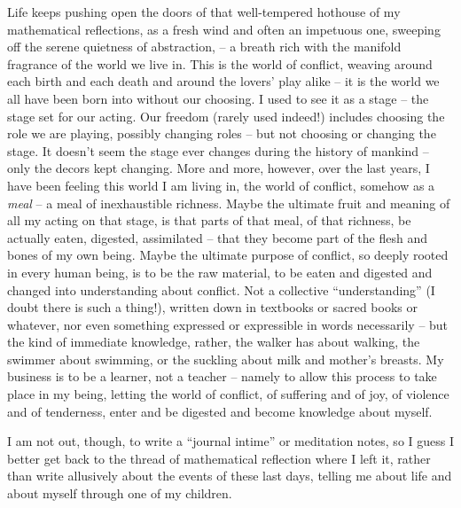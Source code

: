 \label{sec:140}%
Life keeps pushing open the doors of that well-tempered hothouse of my
mathematical reflections, as a fresh wind and often an impetuous one,
sweeping off the serene quietness of abstraction, -- a breath rich
with the manifold fragrance of the world we live in. This is the world
of conflict, weaving around each birth and each death and around the
lovers' play alike -- it is the world we all have been born into
without our choosing. I used to see it as a stage -- the stage set for
our acting. Our freedom (rarely used indeed!) includes choosing the
role we are playing, possibly changing roles -- but not choosing or
changing the stage. It doesn't seem the stage ever changes during the
history of mankind -- only the decors kept changing. More and more,
however, over the last years, I have been feeling this world I am
living in, the world of conflict, somehow as a \emph{meal} -- a meal
of inexhaustible richness. Maybe the ultimate fruit and meaning of all
my acting on that stage, is that parts of that meal, of that richness,
be actually eaten, digested, assimilated -- that they become part of
the flesh and bones of my own being. Maybe the ultimate purpose of
conflict, so deeply rooted in every human being, is to be the raw
material, to be eaten and digested and changed into understanding
about conflict. Not a collective ``understanding'' (I doubt there is
such a thing!), written down in textbooks or sacred books or whatever,
nor even something expressed or expressible in words necessarily --
but the kind of immediate knowledge, rather, the walker has about
walking, the swimmer about swimming, or the suckling about milk and
mother's breasts. My business is to be a learner, not a teacher --
namely to allow this process to take place in my being, letting the
world of conflict, of suffering and of joy, of violence and of
tenderness, enter and be digested and become knowledge about myself.

I am not out, though, to write a ``journal intime'' or meditation
notes, so I guess I better get back to the thread of mathematical
reflection where I left it, rather than write allusively about the
events of these last days, telling me about life and about myself
through one of my children.

\bigbreak

\noindent\hfill{}\par

